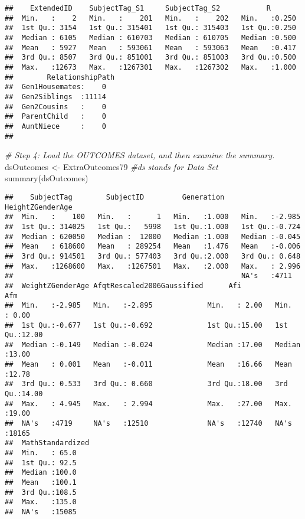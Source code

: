 \documentclass[smallextended]{svjour3}       %
\newenvironment{Shaded}{\begin{snugshade}}{\end{snugshade}}
\newcommand{\CommentTok}[1]{\textcolor[rgb]{0.56,0.35,0.01}{\textit{#1}}}
\newcommand{\FunctionTok}[1]{\textcolor[rgb]{0.00,0.00,0.00}{#1}}
\newcommand{\NormalTok}[1]{#1}
\newcommand{\OtherTok}[1]{\textcolor[rgb]{0.56,0.35,0.01}{#1}}
\begin{document}
\begin{verbatim}
##    ExtendedID    SubjectTag_S1     SubjectTag_S2           R        
##  Min.   :    2   Min.   :    201   Min.   :    202   Min.   :0.250  
##  1st Qu.: 3154   1st Qu.: 315401   1st Qu.: 315403   1st Qu.:0.250  
##  Median : 6105   Median : 610703   Median : 610705   Median :0.500  
##  Mean   : 5927   Mean   : 593061   Mean   : 593063   Mean   :0.417  
##  3rd Qu.: 8507   3rd Qu.: 851001   3rd Qu.: 851003   3rd Qu.:0.500  
##  Max.   :12673   Max.   :1267301   Max.   :1267302   Max.   :1.000  
##        RelationshipPath
##  Gen1Housemates:    0  
##  Gen2Siblings  :11114  
##  Gen2Cousins   :    0  
##  ParentChild   :    0  
##  AuntNiece     :    0  
## 
\end{verbatim}

\begin{Shaded}
\begin{Highlighting}[]
\CommentTok{\# Step 4: Load the OUTCOMES dataset, and then examine the summary.}
\NormalTok{dsOutcomes }\OtherTok{\textless{}{-}}\NormalTok{ ExtraOutcomes79 }\CommentTok{\#\textquotesingle{}ds\textquotesingle{} stands for \textquotesingle{}Data Set\textquotesingle{}}
\FunctionTok{summary}\NormalTok{(dsOutcomes)}
\end{Highlighting}
\end{Shaded}

\begin{verbatim}
##    SubjectTag        SubjectID         Generation    HeightZGenderAge
##  Min.   :    100   Min.   :      1   Min.   :1.000   Min.   :-2.985  
##  1st Qu.: 314025   1st Qu.:   5998   1st Qu.:1.000   1st Qu.:-0.724  
##  Median : 620050   Median :  12000   Median :1.000   Median :-0.045  
##  Mean   : 618600   Mean   : 289254   Mean   :1.476   Mean   :-0.006  
##  3rd Qu.: 914501   3rd Qu.: 577403   3rd Qu.:2.000   3rd Qu.: 0.648  
##  Max.   :1268600   Max.   :1267501   Max.   :2.000   Max.   : 2.996  
##                                                      NA's   :4711    
##  WeightZGenderAge AfqtRescaled2006Gaussified      Afi             Afm       
##  Min.   :-2.985   Min.   :-2.895             Min.   : 2.00   Min.   : 0.00  
##  1st Qu.:-0.677   1st Qu.:-0.692             1st Qu.:15.00   1st Qu.:12.00  
##  Median :-0.149   Median :-0.024             Median :17.00   Median :13.00  
##  Mean   : 0.001   Mean   :-0.011             Mean   :16.66   Mean   :12.78  
##  3rd Qu.: 0.533   3rd Qu.: 0.660             3rd Qu.:18.00   3rd Qu.:14.00  
##  Max.   : 4.945   Max.   : 2.994             Max.   :27.00   Max.   :19.00  
##  NA's   :4719     NA's   :12510              NA's   :12740   NA's   :18165  
##  MathStandardized
##  Min.   : 65.0   
##  1st Qu.: 92.5   
##  Median :100.0   
##  Mean   :100.1   
##  3rd Qu.:108.5   
##  Max.   :135.0   
##  NA's   :15085
\end{verbatim}
\end{document}
